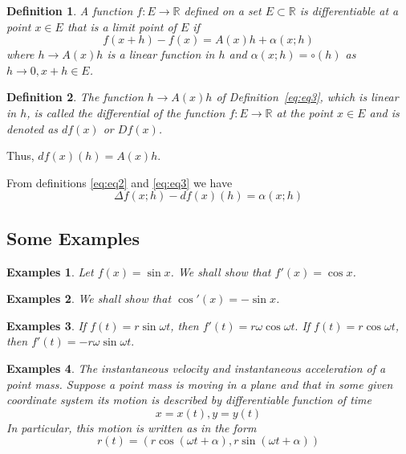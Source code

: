 \documentclass[a4paper,12pt]{article} %
\newtheorem{definition}{Definition}[section]
\newtheorem{example}{Examples}
\begin{document}
\begin{definition}
    A function $f: E \to \mathbb{R}$ defined on a set $E \subset \mathbb{R}$
    is differentiable at a point $x \in E$ that is a limit point of $E$
    if 
    \begin{equation}
        f(x+h) - f(x) = A(x)h + \alpha(x;h)
        \label{eq:eq3}
    \end{equation}
    where $h \to A(x)h$ is a linear function in $h$ and $\alpha(x;h) = \circ(h)$
    as $h \to 0, x+h \in E$.
\end{definition}

\begin{definition}
    The function $h \to A(x)h$ of Definition~\ref{eq:eq3}, which 
    is linear in $h$, is called the differential of the function 
    $f: E \to \mathbb{R}$ at the point $x \in E$ and is denoted as 
    $df(x)$ or $Df(x)$.
\end{definition}

Thus, $df(x)(h) = A(x)h.$

From definitions \ref{eq:eq2} and \ref{eq:eq3} we have
\[
    \Delta f(x;h) - df(x)(h) = \alpha(x;h)
    \]
\subsection{Some Examples}

\begin{example}
    Let $f(x) = \sin x$. We shall show that $f'(x) = \cos x$.
\end{example}

\begin{example}
    We shall show that $\cos'(x) = - \sin x$.
\end{example}

\begin{example}
    If $f(t) = r\sin \omega t$, then $f'(t) = r\omega \cos \omega t.$
    If $f(t) = r\cos \omega t$, then $f'(t) = -r\omega \sin \omega t.$
\end{example}

\begin{example}
    The instantaneous velocity and instantaneous acceleration 
    of a point mass. Suppose a point mass is moving in a plane 
    and that in some given coordinate system its motion 
    is described by differentiable function of time 
    \[
        x = x(t), y=y(t)
    \]
    In particular, this motion is written as in the form 
    \[
        r(t) = \left(r\cos (\omega t + \alpha), r\sin (\omega t+ \alpha)\right)
    \]
\end{example}
\end{document}
